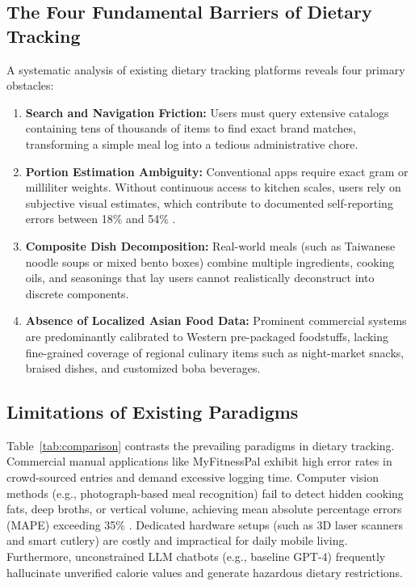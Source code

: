 \documentclass[conference]{IEEEtran}
\begin{document}
\subsection{The Four Fundamental Barriers of Dietary Tracking}
A systematic analysis of existing dietary tracking platforms reveals four primary obstacles:
\begin{enumerate}
    \item \textbf{Search and Navigation Friction:} Users must query extensive catalogs containing tens of thousands of items to find exact brand matches, transforming a simple meal log into a tedious administrative chore.
    \item \textbf{Portion Estimation Ambiguity:} Conventional apps require exact gram or milliliter weights. Without continuous access to kitchen scales, users rely on subjective visual estimates, which contribute to documented self-reporting errors between 18\% and 54\% \cite{poslusna2009misreporting}.
    \item \textbf{Composite Dish Decomposition:} Real-world meals (such as Taiwanese noodle soups or mixed bento boxes) combine multiple ingredients, cooking oils, and seasonings that lay users cannot realistically deconstruct into discrete components.
    \item \textbf{Absence of Localized Asian Food Data:} Prominent commercial systems are predominantly calibrated to Western pre-packaged foodstuffs, lacking fine-grained coverage of regional culinary items such as night-market snacks, braised dishes, and customized boba beverages.
\end{enumerate}

\subsection{Limitations of Existing Paradigms}
Table~\ref{tab:comparison} contrasts the prevailing paradigms in dietary tracking. Commercial manual applications like MyFitnessPal exhibit high error rates in crowd-sourced entries and demand excessive logging time. Computer vision methods (e.g., photograph-based meal recognition) fail to detect hidden cooking fats, deep broths, or vertical volume, achieving mean absolute percentage errors (MAPE) exceeding 35\% \cite{cheng2024can}. Dedicated hardware setups (such as 3D laser scanners and smart cutlery) are costly and impractical for daily mobile living. Furthermore, unconstrained LLM chatbots (e.g., baseline GPT-4) frequently hallucinate unverified calorie values and generate hazardous dietary restrictions.
\end{document}
